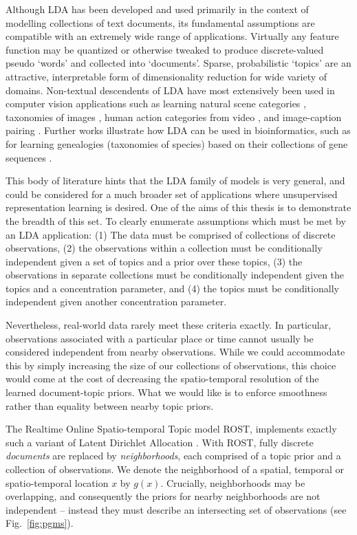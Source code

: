 Although LDA has been developed and used primarily in the context of modelling collections of text documents, its fundamental assumptions are compatible with an extremely wide range of applications. Virtually any feature function may be quantized or otherwise tweaked to produce discrete-valued pseudo `words' and collected into `documents'. Sparse, probabilistic `topics' are an attractive, interpretable form of dimensionality reduction for wide variety of domains. Non-textual descendents of LDA have most extensively been used in computer vision applications such as learning natural scene categories \citep{FeiFei2005}, taxonomies of images \citep{bart2011}, human action categories from video \citep{Niebles2008}, and image-caption pairing \citep{Blei2003Captions}. Further works illustrate how LDA can be used in bioinformatics, such as for learning genealogies (taxonomies of species) based on their collections of gene sequences \citep{Pritchard2000}. 

This body of literature hints that the LDA family of models is very general, and could be considered for a much broader set of applications where unsupervised representation learning is desired. One of the aims of this thesis is to demonstrate the breadth of this set. To clearly enumerate assumptions which must be met by an LDA application: (1) The data must be comprised of collections of discrete observations, (2) the observations within a collection must be conditionally independent given a set of topics and a prior over these topics, (3) the observations in separate collections must be conditionally independent given the topics and a concentration parameter, and (4) the topics must be conditionally independent given another concentration parameter.

Nevertheless, real-world data rarely meet these criteria exactly. In particular, observations associated with a particular place or time cannot usually be considered independent from nearby observations. While we could accommodate this by simply increasing the size of our collections of observations, this choice would come at the cost of decreasing the spatio-temporal resolution of the learned document-topic priors. What we would like is to enforce smoothness rather than equality between nearby topic priors.

The Realtime Online Spatio-temporal Topic model ROST, implements exactly such a variant of Latent Dirichlet Allocation \citep{Girdhar2014}. With ROST, fully discrete \emph{documents} are replaced by \emph{neighborhoods}, each comprised of a topic prior and a collection of observations. We denote the neighborhood of a spatial, temporal or spatio-temporal location $x$ by $g(x)$. Crucially, neighborhoods may be overlapping, and consequently the priors for nearby neighborhoods are not independent -- instead they must describe an intersecting set of observations (see Fig.~\ref{fig:pgms}).

